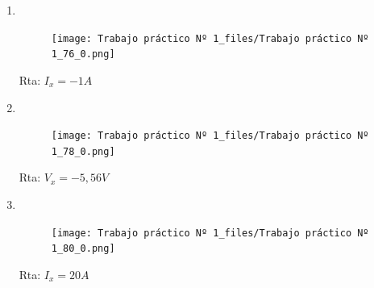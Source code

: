 \documentclass[10pt,a4paper]{article}
\begin{document}
\begin{enumerate}
\begin{enumerate}
	\item \
	
	\begin{figure}[H]
		\centering
		\texttt{[image: Trabajo práctico Nº 1\_files/Trabajo práctico Nº 1\_76\_0.png]}
		\label{e16a}
	\end{figure}
	
	Rta: $I_x=-1A$

	\item \
	
	\begin{figure}[H]
		\centering
		\texttt{[image: Trabajo práctico Nº 1\_files/Trabajo práctico Nº 1\_78\_0.png]}
		\label{e16b}
	\end{figure}
	Rta: $V_x=-5,56V$
	
		\item \
	
	\begin{figure}[H]
		\centering
		\texttt{[image: Trabajo práctico Nº 1\_files/Trabajo práctico Nº 1\_80\_0.png]}
		\label{e16c}
	\end{figure}
	
	Rta: $I_x=20A$

\end{enumerate}













    
\end{enumerate}
    
\end{document}
